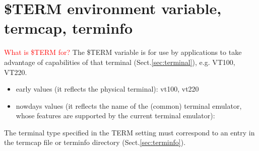 \section{\$TERM environment variable, termcap, terminfo}
\label{sec:TERM-variable}
\label{sec:TERM-env-var}
\label{sec:env-var-TERM}


\textcolor{red}{What is \$TERM for?}  The \$TERM variable is for use by
applications to take advantage of capabilities of that terminal
(Sect.\ref{sec:terminal}), e.g. VT100, VT220.
\begin{itemize}
  \item early values (it reflects the physical terminal): vt100, vt220
  
  
  \item nowdays values (it reflects the name of the (common) terminal emulator,
  whose features are supported by the current terminal emulator):
    
\end{itemize}

The terminal type specified in the TERM setting must correspond to an entry in
the termcap file or terminfo directory (Sect.\ref{sec:terminfo}).

